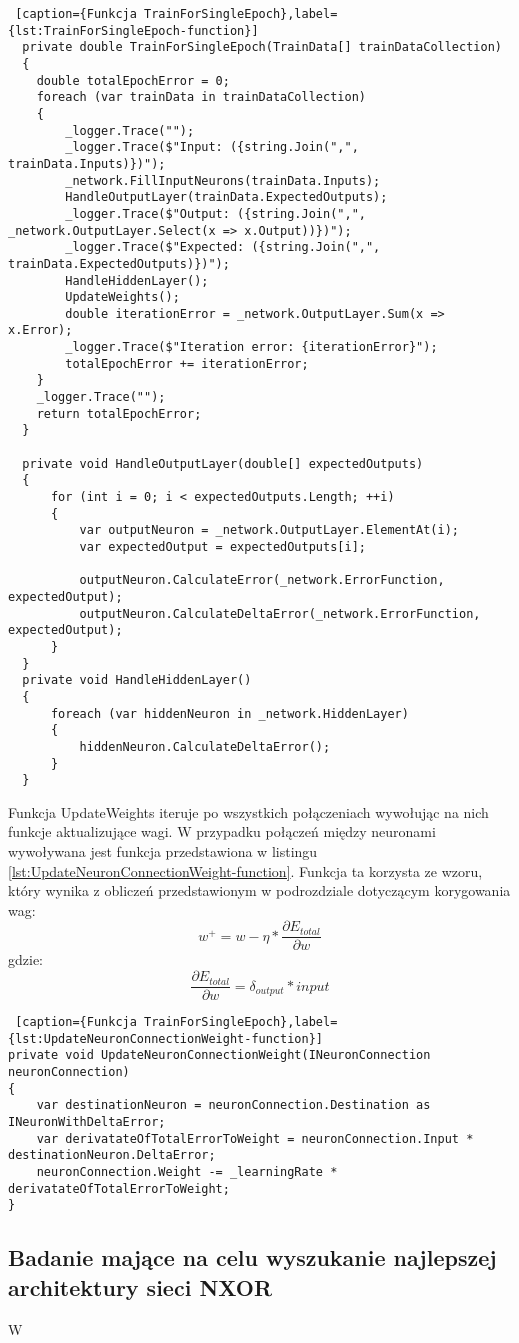 \begin{lstlisting} [caption={Funkcja TrainForSingleEpoch},label={lst:TrainForSingleEpoch-function}]
  private double TrainForSingleEpoch(TrainData[] trainDataCollection)
  {
    double totalEpochError = 0;
    foreach (var trainData in trainDataCollection)
    {
        _logger.Trace("");
        _logger.Trace($"Input: ({string.Join(",", trainData.Inputs)})");
        _network.FillInputNeurons(trainData.Inputs);
        HandleOutputLayer(trainData.ExpectedOutputs);
        _logger.Trace($"Output: ({string.Join(",", _network.OutputLayer.Select(x => x.Output))})");
        _logger.Trace($"Expected: ({string.Join(",", trainData.ExpectedOutputs)})");
        HandleHiddenLayer();
        UpdateWeights();
        double iterationError = _network.OutputLayer.Sum(x => x.Error);
        _logger.Trace($"Iteration error: {iterationError}");
        totalEpochError += iterationError;
    }
    _logger.Trace("");
    return totalEpochError;
  }

  private void HandleOutputLayer(double[] expectedOutputs)
  {
      for (int i = 0; i < expectedOutputs.Length; ++i)
      {
          var outputNeuron = _network.OutputLayer.ElementAt(i);
          var expectedOutput = expectedOutputs[i];

          outputNeuron.CalculateError(_network.ErrorFunction, expectedOutput);
          outputNeuron.CalculateDeltaError(_network.ErrorFunction, expectedOutput);
      }
  }
  private void HandleHiddenLayer()
  {
      foreach (var hiddenNeuron in _network.HiddenLayer)
      {
          hiddenNeuron.CalculateDeltaError();
      }
  }

\end{lstlisting}

Funkcja UpdateWeights iteruje po wszystkich połączeniach wywołując na nich funkcje aktualizujące wagi.
W przypadku połączeń między neuronami wywoływana jest funkcja przedstawiona w listingu \ref{lst:UpdateNeuronConnectionWeight-function}.
Funkcja ta korzysta ze wzoru, który wynika z obliczeń przedstawionym w podrozdziale dotyczącym korygowania wag:
\[
w^+=w-\eta*\frac{\partial E_{total}}{\partial w}  
\]
gdzie:
\[
  \frac{\partial E_{total}}{\partial w}  =\delta_{output}*input
\]

\begin{lstlisting} [caption={Funkcja TrainForSingleEpoch},label={lst:UpdateNeuronConnectionWeight-function}]
private void UpdateNeuronConnectionWeight(INeuronConnection neuronConnection)
{
    var destinationNeuron = neuronConnection.Destination as INeuronWithDeltaError;
    var derivatateOfTotalErrorToWeight = neuronConnection.Input * destinationNeuron.DeltaError;
    neuronConnection.Weight -= _learningRate * derivatateOfTotalErrorToWeight;
}
\end{lstlisting}

\subsection{Badanie mające na celu wyszukanie najlepszej architektury sieci NXOR}

W


